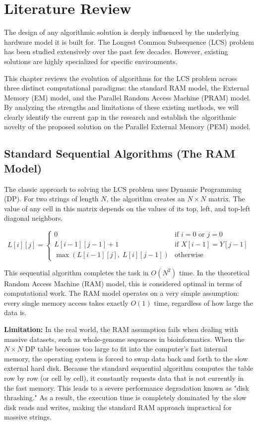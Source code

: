 
\chapter{Literature Review}

The design of any algorithmic solution is deeply influenced by the underlying hardware model it is built for. The Longest Common Subsequence (LCS) problem has been studied extensively over the past few decades. However, existing solutions are highly specialized for specific environments. 

This chapter reviews the evolution of algorithms for the LCS problem across three distinct computational paradigms: the standard RAM model, the External Memory (EM) model, and the Parallel Random Access Machine (PRAM) model. By analyzing the strengths and limitations of these existing methods, we will clearly identify the current gap in the research and establish the algorithmic novelty of the proposed solution on the Parallel External Memory (PEM) model.

\section{Standard Sequential Algorithms (The RAM Model)}
The classic approach to solving the LCS problem uses Dynamic Programming (DP). For two strings of length $N$, the algorithm creates an $N \times N$ matrix. The value of any cell in this matrix depends on the values of its top, left, and top-left diagonal neighbors\cite{clrs-ia-09,aho-dac-74}. 

\[
L[i][j] =
\begin{cases}
0 & \text{if } i=0 \text{ or } j=0 \\[6pt]
L[i-1][j-1] + 1 & \text{if } X[i-1] = Y[j-1] \\[6pt]
\max(L[i-1][j],\; L[i][j-1]) & \text{otherwise}
\end{cases}
\]

This sequential algorithm completes the task in $O(N^2)$ time. In the theoretical Random Access Machine (RAM) model, this is considered optimal in terms of computational work. The RAM model operates on a very simple assumption: every single memory access takes exactly $O(1)$ time, regardless of how large the data is.



\textbf{Limitation:} In the real world, the RAM assumption fails when dealing with massive datasets, such as whole-genome sequences in bioinformatics. When the $N \times N$ DP table becomes too large to fit into the computer's fast internal memory, the operating system is forced to swap data back and forth to the slow external hard disk. Because the standard sequential algorithm computes the table row by row (or cell by cell), it constantly requests data that is not currently in the fast memory. This leads to a severe performance degradation known as "disk thrashing." As a result, the execution time is completely dominated by the slow disk reads and writes, making the standard RAM approach impractical for massive strings.

